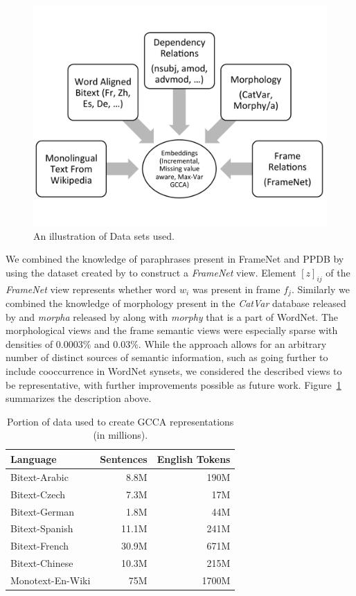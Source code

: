 \documentclass[11pt]{article}
\begin{document}
\begin{figure}
  \includegraphics[trim=0 70 0 35,clip,width=\linewidth]{cartoonbw.pdf}
  \caption{An illustration of Data sets used.}
  \label{fig:cartoon}
  \end{figure}


We combined the knowledge of paraphrases present in FrameNet and PPDB
by using the dataset created by  to
construct a \textit{FrameNet} view. Element $[z]_{ij}$ of the
\textit{FrameNet} view represents whether word $w_i$ was present in
frame $f_j$. Similarly we combined the knowledge of morphology present
in the \textit{CatVar} database released by 
and \textit{morpha} released by  along with \textit{morphy} that is a part of WordNet.
The morphological views and the frame semantic views were especially
sparse with densities of 0.0003\% and 0.03\%. While the approach
allows for an arbitrary number of distinct sources of semantic
information, such as going further to include cooccurrence in WordNet
synsets, we considered the described views to be representative, with
further improvements possible as future work.
Figure~\ref{fig:cartoon} summarizes the description above.

\begin{table}[htbp]
  \centering
  \begin{tabular}{lrr}
    Language & Sentences & English Tokens \\
    \hline
    Bitext-Arabic   & 8.8M   & 190M  \\
    Bitext-Czech    & 7.3M   & 17M   \\
    Bitext-German   & 1.8M   & 44M   \\
    Bitext-Spanish  & 11.1M  & 241M  \\
    Bitext-French   & 30.9M  & 671M  \\
    Bitext-Chinese  & 10.3M  & 215M  \\
    Monotext-En-Wiki& 75M    & 1700M 
  \end{tabular}  
  \caption{Portion of data used to create GCCA representations (in millions).}
  \label{tab:dataperlang}
\end{table}
\end{document}
